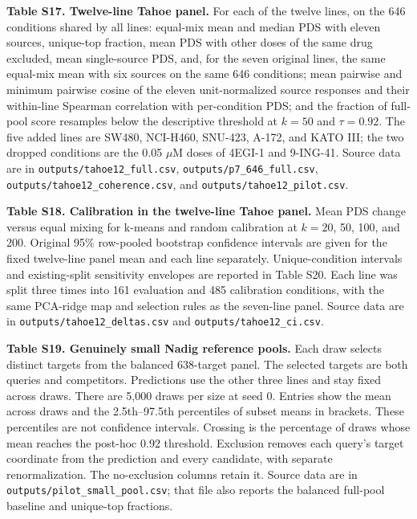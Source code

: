 \documentclass[12pt]{article}
\begin{document}
\begin{singlespace}
\noindent\textbf{Table S17. Twelve-line Tahoe panel.} For each of the twelve lines, on the 646 conditions shared by all lines: equal-mix mean and median PDS with eleven sources, unique-top fraction, mean PDS with other doses of the same drug excluded, mean single-source PDS, and, for the seven original lines, the same equal-mix mean with six sources on the same 646 conditions; mean pairwise and minimum pairwise cosine of the eleven unit-normalized source responses and their within-line Spearman correlation with per-condition PDS; and the fraction of full-pool score resamples below the descriptive threshold at $k=50$ and $\tau=0.92$. The five added lines are SW480, NCI-H460, SNU-423, A-172, and KATO III; the two dropped conditions are the 0.05 $\mu$M doses of 4EGI-1 and 9-ING-41. Source data are in \texttt{outputs/tahoe12\_full.csv}, \texttt{outputs/p7\_646\_full.csv}, \texttt{outputs/tahoe12\_coherence.csv}, and \texttt{outputs/tahoe12\_pilot.csv}.

\noindent\textbf{Table S18. Calibration in the twelve-line Tahoe panel.} Mean PDS change versus equal mixing for k-means and random calibration at $k=20$, 50, 100, and 200. Original 95\% row-pooled bootstrap confidence intervals are given for the fixed twelve-line panel mean and each line separately. Unique-condition intervals and existing-split sensitivity envelopes are reported in Table S20. Each line was split three times into 161 evaluation and 485 calibration conditions, with the same PCA-ridge map and selection rules as the seven-line panel. Source data are in \texttt{outputs/tahoe12\_deltas.csv} and \texttt{outputs/tahoe12\_ci.csv}.

\clearpage

\noindent\textbf{Table S19. Genuinely small Nadig reference pools.} Each draw selects distinct targets from the balanced 638-target panel. The selected targets are both queries and competitors. Predictions use the other three lines and stay fixed across draws. There are 5,000 draws per size at seed 0. Entries show the mean across draws and the 2.5th--97.5th percentiles of subset means in brackets. These percentiles are not confidence intervals. Crossing is the percentage of draws whose mean reaches the post-hoc 0.92 threshold. Exclusion removes each query's target coordinate from the prediction and every candidate, with separate renormalization. The no-exclusion columns retain it. Source data are in \texttt{outputs/pilot\_small\_pool.csv}; that file also reports the balanced full-pool baseline and unique-top fractions.


\end{singlespace}
\end{document}
